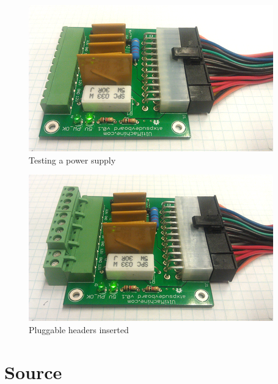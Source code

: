 \begin{figure}[H]
\centering
\includegraphics{./png/step-11.png}
\caption{Testing a power supply}
\end{figure}

\begin{figure}[H]
\centering
\includegraphics{./png/step-12.png}
\caption{Pluggable headers inserted}
\end{figure}

\section{Source}
